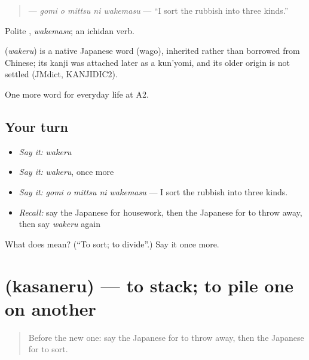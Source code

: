 \begin{quote}
\textbf{  } — \emph{gomi o mittsu ni wakemasu} — \textquotedblleft{}I sort the rubbish into three kinds.\textquotedblright{}
\end{quote}

Polite \textbf{}, \emph{wakemasu}; an ichidan verb.

\begin{cousinweb}
\textbf{} (\emph{wakeru}) is a native Japanese word (wago), inherited rather than borrowed from Chinese; its kanji was attached later as a kun'yomi, and its older origin is not settled (JMdict, KANJIDIC2).
\end{cousinweb}

\begin{grammarlens}[title={What you've built}]
One more word for everyday life at A2.
\end{grammarlens}

\subsection*{Your turn}
\begin{itemize}
\raggedright
  \item \emph{Say it:} \emph{wakeru}
  \item \emph{Say it:} \emph{wakeru}, once more
  \item \emph{Say it:} \emph{gomi o mittsu ni wakemasu} — I sort the rubbish into three kinds.
  \item \emph{Recall:} say the Japanese for housework, then the Japanese for to throw away, then say \emph{wakeru} again
\end{itemize}

\begin{tcolorbox}[breakable,colback=teal!4,colframe=teal!35!black,title={Before you move on}]
What does  mean? (\textquotedblleft{}To sort; to divide\textquotedblright{}.) Say it once more.
\end{tcolorbox}
\section[\texorpdfstring{\ja{かさねる} (kasaneru)}{かさねる (kasaneru)}]{ (kasaneru) — to stack; to pile one on another}

\label{lesson:JA-C159-kasaneru}



\begin{quote}
Before the new one: say the Japanese for to throw away, then the Japanese for to sort.
\end{quote}


